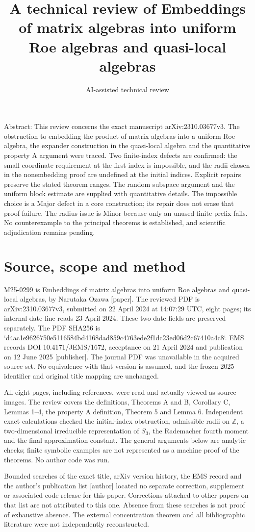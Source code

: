 \documentclass[10pt]{article}
\title{A technical review of
Embeddings of matrix algebras into uniform Roe algebras and quasi-local algebras}
\author{AI-assisted technical review}
\date{}
\begin{document}
\maketitle
Abstract: This review concerns the exact manuscript arXiv:2310.03677v3. The obstruction to embedding the product of matrix algebras into a uniform Roe algebra, the expander construction in the quasi-local algebra and the quantitative property A argument were traced. Two finite-index defects are confirmed: the small-coordinate requirement at the first index is impossible, and the radii chosen in the nonembedding proof are undefined at the initial indices. Explicit repairs preserve the stated theorem ranges. The random subspace argument and the uniform block estimate are supplied with quantitative details. The impossible choice is a Major defect in a core construction; its repair does not erase that proof failure. The radius issue is Minor because only an unused finite prefix fails. No counterexample to the principal theorems is established, and scientific adjudication remains pending.\par
\section*{Source, scope and method}
M25-0299 is Embeddings of matrix algebras into uniform Roe algebras and quasi-local algebras, by Narutaka Ozawa [paper]. The reviewed PDF is arXiv:2310.03677v3, submitted on 22 April 2024 at 14:07:29 UTC, eight pages; its internal date line reads 23 April 2024. These two date fields are preserved separately. The PDF SHA256 is `d4ac1e9626750e5116584bd4168dad859c4763ede2f1dc23ed06d2c67410a4c8`. EMS records DOI 10.4171/JEMS/1672, acceptance on 21 April 2024 and publication on 12 June 2025 [publisher]. The journal PDF was unavailable in the acquired source set. No equivalence with that version is assumed, and the frozen 2025 identifier and original title mapping are unchanged.\par
All eight pages, including references, were read and actually viewed as source images. The review covers the definitions, Theorems A and B, Corollary C, Lemmas 1–4, the property A definition, Theorem 5 and Lemma 6. Independent exact calculations checked the initial-index obstruction, admissible radii on \(\mathbb Z\), a two-dimensional irreducible representation of \(S_3\), the Rademacher fourth moment and the final approximation constant. The general arguments below are analytic checks; finite symbolic examples are not represented as a machine proof of the theorems. No author code was run.\par
Bounded searches of the exact title, arXiv version history, the EMS record and the author’s publication list [author] located no separate correction, supplement or associated code release for this paper. Corrections attached to other papers on that list are not attributed to this one. Absence from these searches is not proof of exhaustive absence. The external concentration theorem and all bibliographic literature were not independently reconstructed.\par
\end{document}
